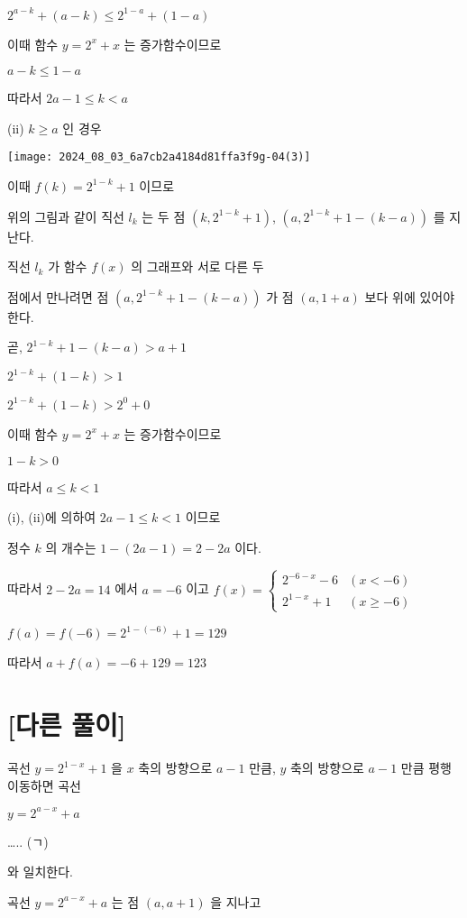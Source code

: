 \documentclass[10pt]{article}
\begin{document}
\(2^{a-k}+(a-k) \leq 2^{1-a}+(1-a)\)

이때 함수 \(y=2^{x}+x\) 는 증가함수이므로

\(a-k \leq 1-a\)

따라서 \(2 a-1 \leq k<a\)

(ii) \(k \geq a\) 인 경우

\begin{center}
\texttt{[image: 2024\_08\_03\_6a7cb2a4184d81ffa3f9g-04(3)]}
\end{center}

이때 \(f(k)=2^{1-k}+1\) 이므로

위의 그림과 같이 직선 \(l_{k}\) 는 두 점 \(\left(k, 2^{1-k}+1\right)\), \(\left(a, 2^{1-k}+1-(k-a)\right)\) 를 지난다.

직선 \(l_{k}\) 가 함수 \(f(x)\) 의 그래프와 서로 다른 두

점에서 만나려면 점 \(\left(a, 2^{1-k}+1-(k-a)\right)\) 가 점 \((a, 1+a)\) 보다 위에 있어야 한다.

곧, \(2^{1-k}+1-(k-a)>a+1\)

\(2^{1-k}+(1-k)>1\)

\(2^{1-k}+(1-k)>2^{0}+0\)

이때 함수 \(y=2^{x}+x\) 는 증가함수이므로

\(1-k>0\)

따라서 \(a \leq k<1\)

(i), (ii)에 의하여 \(2 a-1 \leq k<1\) 이므로

정수 \(k\) 의 개수는 \(1-(2 a-1)=2-2 a\) 이다.

따라서 \(2-2 a=14\) 에서 \(a=-6\) 이고 \(f(x)= \begin{cases}2^{-6-x}-6 & (x<-6) \\ 2^{1-x}+1 & (x \geq-6)\end{cases}\)

\(f(a)=f(-6)=2^{1-(-6)}+1=129\)

따라서 \(a+f(a)=-6+129=123\)

\section*{[다른 풀이]}
곡선 \(y=2^{1-x}+1\) 을 \(x\) 축의 방향으로 \(a-1\) 만큼, \(y\) 축의 방향으로 \(a-1\) 만큼 평행이동하면 곡선

\(y=2^{a-x}+a\)

….. (ㄱ)

와 일치한다.

곡선 \(y=2^{a-x}+a\) 는 점 \((a, a+1)\) 을 지나고
\end{document}
